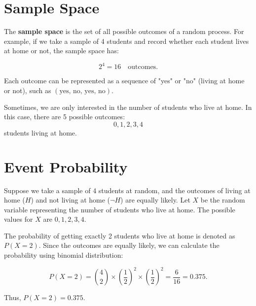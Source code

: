 \documentclass{article}
\begin{document}
\section{Sample Space}
The \textbf{sample space} is the set of all possible outcomes of a random process. For example, if we take a sample of 4 students and record whether each student lives at home or not, the sample space has:

\[
2^4 = 16 \quad \text{outcomes}.
\]

Each outcome can be represented as a sequence of "yes" or "no" (living at home or not), such as $(\text{yes, no, yes, no})$.

Sometimes, we are only interested in the number of students who live at home. In this case, there are 5 possible outcomes:
\[
0, 1, 2, 3, 4
\]
students living at home.

\section{Event Probability}
Suppose we take a sample of 4 students at random, and the outcomes of living at home ($H$) and not living at home ($\neg H$) are equally likely. Let $X$ be the random variable representing the number of students who live at home. The possible values for $X$ are $0, 1, 2, 3, 4$. 

The probability of getting exactly 2 students who live at home is denoted as $P(X = 2)$. Since the outcomes are equally likely, we can calculate the probability using binomial distribution:

\[
P(X = 2) = \binom{4}{2} \times \left(\frac{1}{2}\right)^2 \times \left(\frac{1}{2}\right)^2 = \frac{6}{16} = 0.375.
\]

Thus, $P(X = 2) = 0.375$.
\end{document}
